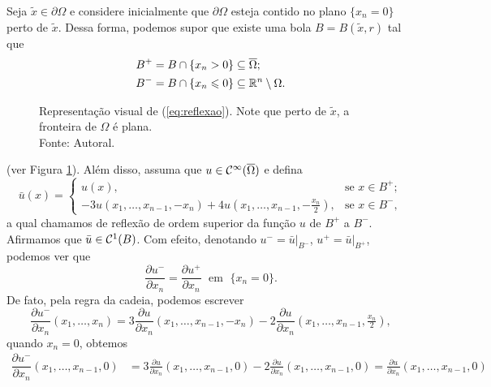\begin{prf}
    Seja $\tilde x \in \partial\Omega$ e considere inicialmente que $\partial\Omega$ esteja contido no plano $\{x_n = 0\}$ perto de $\tilde x$.
    Dessa forma, podemos supor que existe uma bola $B = B(\tilde x, r)$ tal que
    \begin{equation} \label{eq:reflexao}
        \begin{aligned}
            B^+ &= B \cap \{x_n > 0\} \subseteq \overline\Omega;\\
            B^- &= B \cap \{x_n \leqslant 0\} \subseteq \mathbb{R}^n \setminus \Omega.
        \end{aligned}
    \end{equation}
    \begin{figure}
        \centering
        
        \caption{Representação visual de (\ref{eq:reflexao}). Note que perto de $\tilde x$, a fronteira de $\Omega$ é plana.\\Fonte: Autoral.}
        \label{fig:BmaisBmenos}
    \end{figure}
    (ver Figura \ref{fig:BmaisBmenos}).
    Além disso, assuma que $u \in \mathcal{C}^\infty(\overline\Omega)$ e defina
    \begin{equation} \label{eq:barux}
        \bar u(x) =
        \left\{ 
            \begin{array}{ll}
                u(x), & \text{se } x\in B^+;\\
                -3u(x_1,\dots,x_{n-1}, -x_n) + 4u(x_1,\dots,x_{n-1},-\frac{x_n}{2}), & \text{se } x \in B^-,
            \end{array}
        \right.
    \end{equation}
    a qual chamamos de reflexão de ordem superior da função $u$ de $B^+$ a $B^-$.
    Afirmamos que $\bar u \in \mathcal{C}^1(B)$.
    Com efeito, denotando $u^- = \bar u \big|_{B^-}$, $u^+ = \bar u \big|_{B^+}$, podemos ver que
    \[
        \dfrac{\partial u^-}{\partial x_n} = \dfrac{\partial u^+}{\partial x_n} \;\text{ em }\; \{x_n = 0\}.
    \]
    De fato, pela regra da cadeia, podemos escrever
    \[
        \dfrac{\partial u^-}{\partial x_n}(x_1,\dots,x_n) = 3 \frac{\partial u}{\partial x_n}(x_1,\dots,x_{n-1}, -x_n)  - 2\frac{\partial u}{\partial x_n}(x_1,\dots,x_{n-1},\tfrac{x_n}{2}),
    \]
    quando $x_n = 0$, obtemos
    \[
        \begin{aligned}
            \dfrac{\partial u^-}{\partial x_n}(x_1,\dots,x_{n-1},0)
         &= 3\frac{\partial u}{\partial x_n}(x_1,\dots,x_{n-1},0) - 2\frac{\partial u}{\partial x_n}(x_1,\dots,x_{n-1},0) = \frac{\partial u}{\partial x_n}(x_1,\dots,x_{n-1},0)\\[5pt] 

\end{aligned}\]
\end{prf}
